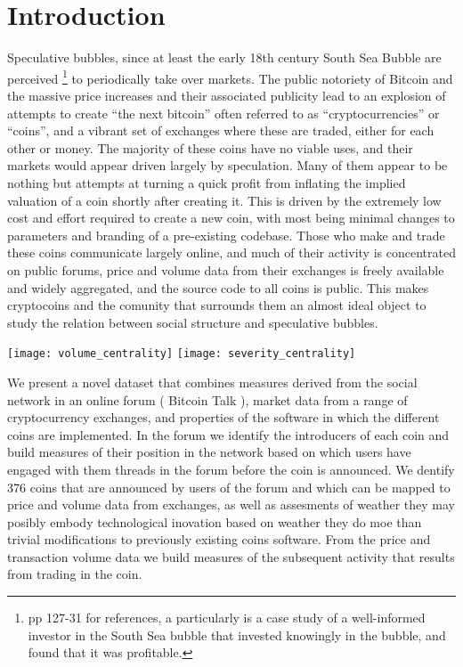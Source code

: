 \section{Introduction}

Speculative bubbles, since at least the early 18th century South Sea Bubble are perceived \footnote{\cite{garber2001famous} pp 127-31 for references, a particularly is \cite{temin2004riding} a case study of a well-informed investor in the South Sea bubble that invested knowingly in the bubble, and found that it was profitable. } to periodically take over markets. %
The public notoriety of Bitcoin and the massive price increases and their associated publicity  lead to an explosion of attempts to create ``the next bitcoin'' often referred to as ``cryptocurrencies'' or ``coins'', and a vibrant set of exchanges where these are traded, either for each other or money.
The majority of these coins have no viable uses, and their markets would appear driven largely by speculation.
Many of them appear to be nothing but attempts at turning a quick profit from inflating the implied valuation of a coin shortly after creating it.
This is driven by the extremely low cost and effort required to create a new coin, with most being minimal changes to parameters and branding of a pre-existing codebase.
Those who make and trade these coins communicate largely online, and much of their activity is concentrated on public forums, price and volume data from their exchanges is freely available and widely aggregated, and the source code to all coins is public.
This makes cryptocoins and the comunity that surrounds them an almost ideal object to study the relation between social structure and speculative bubbles.


\begin{figure*}
\texttt{[image: volume\_centrality]}
\texttt{[image: severity\_centrality]}
\end{figure*}


We present a novel dataset that combines measures derived from the social network in an online forum ( Bitcoin Talk ), market data from a range of cryptocurrency exchanges, and properties of the software in which the different coins are implemented.
In the forum we identify the introducers of each coin and build measures of their position in the network based on which users have engaged with them threads in the forum before the coin is announced.
We dentify 376 coins that are announced by users of the forum and which can be mapped to price and volume data from exchanges, as well as assesments of weather they may posibly embody technological inovation based on weather they do moe than trivial modifications to previously existing coins software.
From the price and transaction volume data we build measures of the subsequent activity that results from trading in the coin. 


